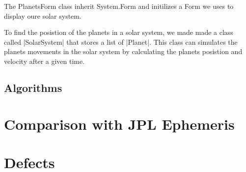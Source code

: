 \documentclass[a4paper]{article}
\begin{document}
The PlanetsForm class inherit System.Form and initilizes a Form we uses to display oure solar system.


To find the posistion of the planets in a solar system, we made made a class called \code|SolarSystem| that stores a list of \code|Planet|. This class can simulates the planets movements in the solar system by calculating the planets posistion and velocity after a given time.


\subsection{Algorithms}



\section{Comparison with JPL Ephemeris}

\section{Defects}
\end{document}
